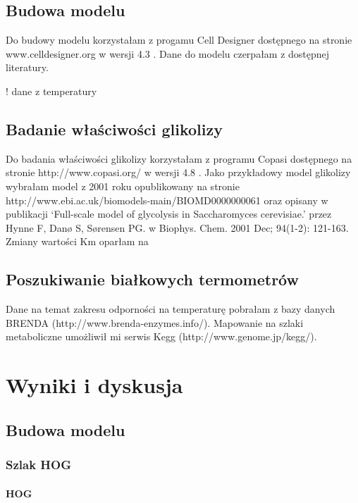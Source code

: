 \documentclass{pracamgr}
\begin{document}
\section{Budowa modelu}

Do budowy modelu korzystałam z progamu Cell Designer dostępnego na stronie www.celldesigner.org w wersji 4.3 . Dane do
modelu czerpałam z dostępnej literatury.

! dane z temperatury 

\section{Badanie właściwości glikolizy}

Do badania właściwości glikolizy korzystałam z programu Copasi dostępnego na stronie  http://www.copasi.org/ w wersji 4.8 .
Jako przykładowy model glikolizy wybrałam model z 2001 roku opublikowany na stronie http://www.ebi.ac.uk/biomodels-main/BIOMD0000000061
oraz opisany w publikacji `Full-scale model of glycolysis in Saccharomyces cerevisiae.' przez Hynne F, Danø S, Sørensen PG. w Biophys. Chem. 2001 Dec; 94(1-2): 121-163.
Zmiany wartości Km oparłam na %

\section{Poszukiwanie białkowych termometrów}

Dane na temat zakresu odporności na temperaturę pobrałam z bazy danych BRENDA (http://www.brenda-enzymes.info/). Mapowanie na szlaki
metaboliczne umożliwił mi serwis Kegg (http://www.genome.jp/kegg/).


\chapter{Wyniki i dyskusja}
\section{Budowa modelu}
\subsection{Szlak HOG}
\subsubsection{HOG}
\end{document}
